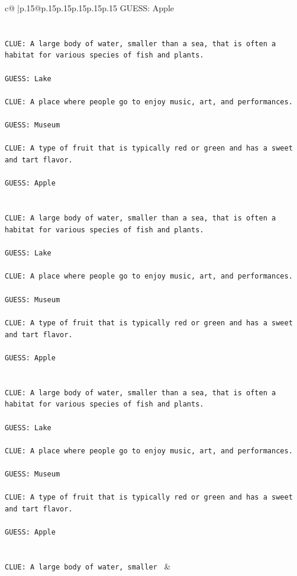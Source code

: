 \documentclass{article}
\begin{document}
{\begin{supertabular}{c@{$\;$}|p{.15\linewidth}@{}p{.15\linewidth}p{.15\linewidth}p{.15\linewidth}p{.15\linewidth}p{.15\linewidth}}
{{{	 GUESS: Apple\\ \tt \\ \tt \\ \tt CLUE: A large body of water, smaller than a sea, that is often a habitat for various species of fish and plants.\\ \tt \\ \tt GUESS: Lake\\ \tt \\ \tt CLUE: A place where people go to enjoy music, art, and performances.\\ \tt \\ \tt GUESS: Museum\\ \tt \\ \tt CLUE: A type of fruit that is typically red or green and has a sweet and tart flavor.\\ \tt \\ \tt GUESS: Apple\\ \tt \\ \tt \\ \tt CLUE: A large body of water, smaller than a sea, that is often a habitat for various species of fish and plants.\\ \tt \\ \tt GUESS: Lake\\ \tt \\ \tt CLUE: A place where people go to enjoy music, art, and performances.\\ \tt \\ \tt GUESS: Museum\\ \tt \\ \tt CLUE: A type of fruit that is typically red or green and has a sweet and tart flavor.\\ \tt \\ \tt GUESS: Apple\\ \tt \\ \tt \\ \tt CLUE: A large body of water, smaller than a sea, that is often a habitat for various species of fish and plants.\\ \tt \\ \tt GUESS: Lake\\ \tt \\ \tt CLUE: A place where people go to enjoy music, art, and performances.\\ \tt \\ \tt GUESS: Museum\\ \tt \\ \tt CLUE: A type of fruit that is typically red or green and has a sweet and tart flavor.\\ \tt \\ \tt GUESS: Apple\\ \tt \\ \tt \\ \tt CLUE: A large body of water, smaller 
	  } 
	   } 
	   } 
	 & \\ 
 


\end{supertabular}}
\end{document}

